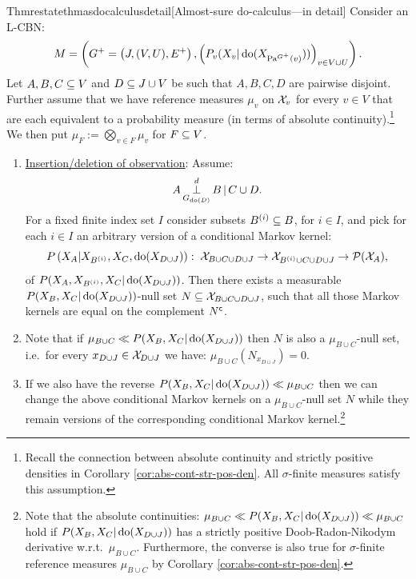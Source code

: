 \begin{restatable}{Thm}{restatethmasdocalculusdetail}[Almost-sure do-calculus---in detail]
    \label{thm:as-do-calculus-1}
    Consider an L-CBN:
    \[M= \left ( G^+=\left ( J,(V,U),E^+ \right ), \left ( P_v ( X_v|\operatorname{do}( X_{\mathrm{Pa}^{G^+}(v)})) \right )_{v \in V \cup U} \right ).\]
    Let $A,B,C \subseteq V$ and $D \subseteq J \cup V$ be such that $A,B,C,D$ are pairwise disjoint.\\
    Further assume that we have reference measures $\mu_v$ on $\mathcal{X}_v$ for every $v \in V$ that are each equivalent to a probability measure (in terms of absolute continuity).\footnote{Recall the connection between absolute continuity and strictly positive densities in Corollary \ref{cor:abs-cont-str-pos-den}. All $\sigma$-finite measures satisfy this assumption.} 
    We then put $\mu_F := \bigotimes_{v \in F} \mu_v$ for $F \subseteq V$.
\begin{enumerate}
\item \underline{Insertion/deletion of observation}: Assume:
        \[ A \operatorname*{\perp}^d_{G_{\operatorname{do}(D)}} B \operatorname*{|} C \cup D. \]
        For a fixed finite index set $I$ consider subsets $B^{(i)} \subseteq B$, for $i \in I$, and pick for each $i \in I$ an arbitrary version of a conditional Markov kernel:
            \[P\left ( X_A|X_{B^{(i)}},X_C,\operatorname{do}(X_{D\cup J})\right ):\;\mathcal{X}_{B \cup C \cup D \cup J} \to \mathcal{X}_{B^{(i)} \cup C \cup D \cup J} \to \mathcal{P}(\mathcal{X}_A), \]
            of $P(X_A,X_{B^{(i)}},X_C|\operatorname{do}(X_{D\cup J}))$.
            Then there exists a measurable $P(X_B,X_C|\operatorname{do}(X_{D\cup J}))$-null set
        $N \subseteq \mathcal{X}_{B \cup C \cup D \cup J}$,
        such that all those Markov kernels are equal on the complement $N^{\mathsf{c}}$.
    \item[] Note that if $\mu_{B \cup C} \ll P(X_B,X_C|\operatorname{do}(X_{D\cup J}))$ then $N$ is also a $\mu_{B \cup C}$-null set, i.e.\ for every $x_{D \cup J} \in \mathcal{X}_{D \cup J}$ we have:
        $\mu_{B \cup C} (N_{x_{D \cup J}}) =0.$
    \item[] If we also have the reverse $ P(X_B,X_C|\operatorname{do}(X_{D\cup J})) \ll \mu_{B \cup C}$ then we can change 
      the above conditional Markov kernels on a $\mu_{B \cup C}$-null set $N$ while they remain versions of the corresponding conditional Markov kernel.\footnote{Note that the absolute continuities: $\mu_{B \cup C}\ll P(X_B,X_C|\operatorname{do}(X_{D\cup J})) \ll \mu_{B \cup C}$ hold if $P(X_B,X_C|\operatorname{do}(X_{D\cup J}))$ has a strictly positive Doob-Radon-Nikodym derivative w.r.t.\ $\mu_{B \cup C}$. Furthermore, the converse is also true for $\sigma$-finite reference measures $\mu_{B \cup C}$ by Corollary \ref{cor:abs-cont-str-pos-den}.}


\end{enumerate}
\end{restatable}
